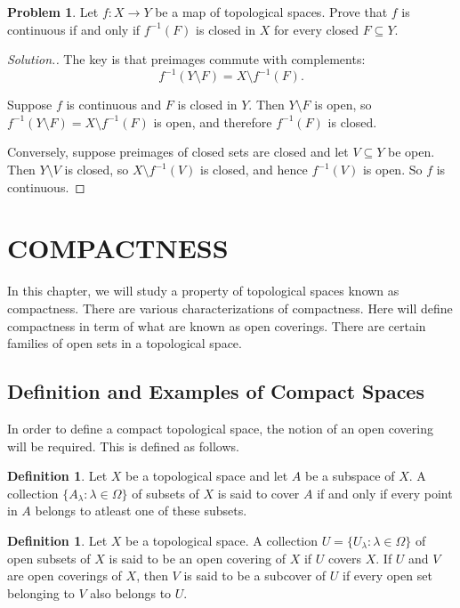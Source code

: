 \documentclass[11pt,a4paper]{article}
\theoremstyle{definition}
\newtheorem{defn}[thm]{Definition}
\newtheorem{problemx}{Problem}[subsection]
\newenvironment{problem}{\begin{problemx}}{\end{problemx}}
\newenvironment{solution}
  {\renewcommand{\qedsymbol}{}\begin{proof}[\textit{Solution}.]}
  {\end{proof}}
\begin{document}
\begin{problem}
Let $f:X\rightarrow Y$ be a map of topological spaces. Prove that $f$ is
continuous if and only if $f^{-1}(F)$ is closed in $X$ for every closed
$F\subseteq Y$.
\end{problem}
\begin{solution}
The key is that preimages commute with complements:
$$f^{-1}\left(Y\setminus F\right) = X\setminus f^{-1}(F).$$

Suppose $f$ is continuous and $F$ is closed in $Y$. Then $Y\setminus F$ is open,
so $f^{-1}(Y\setminus F) = X\setminus f^{-1}(F)$ is open, and therefore
$f^{-1}(F)$ is closed.

Conversely, suppose preimages of closed sets are closed and let $V\subseteq Y$
be open. Then $Y\setminus V$ is closed, so $X\setminus f^{-1}(V)$ is closed, and
hence $f^{-1}(V)$ is open. So $f$ is continuous.
\end{solution}


\section{COMPACTNESS}
In this chapter, we will study a property of topological spaces known as compactness.
There are various characterizations of compactness.
Here will define compactness in term of what are known as open coverings. There are certain families of open sets in a topological space.


\subsection{Definition and Examples of Compact Spaces}
In order to define a compact topological space, the notion of an open covering will be required. This is defined  as follows.



\begin{defn}
Let $X$ be a topological space and let $A$ be a subspace of $X$. A collection $\{A_{\lambda}:\lambda \in \Omega\}$ of subsets of $X$ is said to cover $A$ if and only if every point in $A$ belongs to atleast one of these subsets.
\end{defn}




\begin{defn}
Let $X$ be a topological space. A collection $U=\{U_{\lambda}:\lambda \in \Omega\}$ of open subsets of $X$ is said to be an open covering of $X$ if $U$ covers $X$. If $U$ and $V$ are open coverings of $X$, then $V$ is said to be a subcover of $U$ if every open set belonging to $V$ also belongs to $U$.
\end{defn}
\end{document}
